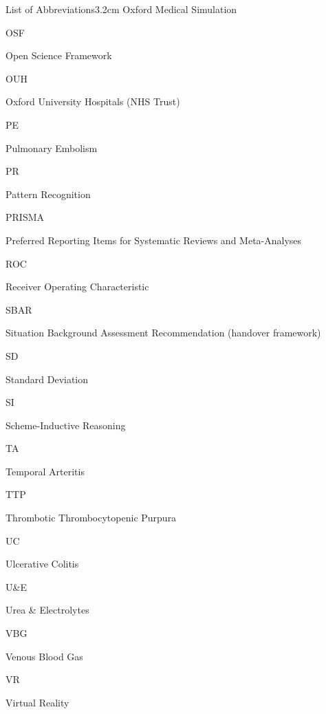 \documentclass[a4paper, nobind]{templates/ociamthesis}
\begin{document}
\begin{romanpages}
\begin{mclistof}{List of Abbreviations}{3.2cm}
Oxford Medical Simulation

\item[OSF]

Open Science Framework

\item[OUH]

Oxford University Hospitals (NHS Trust)

\item[PE]

Pulmonary Embolism

\item[PR]

Pattern Recognition

\item[PRISMA]

Preferred Reporting Items for Systematic Reviews and Meta-Analyses

\item[ROC]

Receiver Operating Characteristic

\item[SBAR]

Situation Background Assessment Recommendation (handover framework)

\item[SD]

Standard Deviation

\item[SI]

Scheme-Inductive Reasoning

\item[TA]

Temporal Arteritis

\item[TTP]

Thrombotic Thrombocytopenic Purpura

\item[UC]

Ulcerative Colitis

\item[U\&E]

Urea \& Electrolytes

\item[VBG]

Venous Blood Gas

\item[VR]

Virtual Reality

\end{mclistof} 


\end{romanpages}
\end{document}
